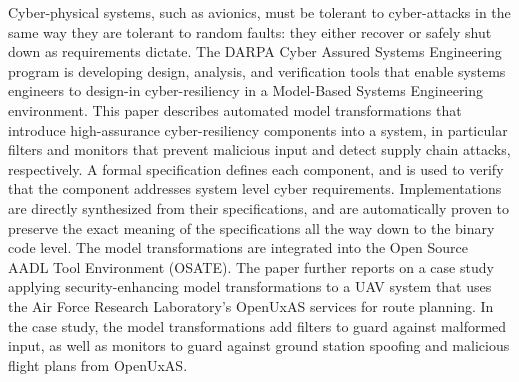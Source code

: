 Cyber-physical systems, such as avionics, must be tolerant to cyber-attacks in the same way they are tolerant to random faults: they either recover or safely shut down as requirements dictate. The DARPA Cyber Assured Systems Engineering program is developing design, analysis, and verification tools that enable systems engineers to design-in cyber-resiliency in a Model-Based Systems Engineering environment. This paper describes automated model transformations that introduce  high-assurance cyber-resiliency components into a system, in particular filters and monitors that prevent malicious input and detect supply chain attacks, respectively. A formal specification defines each component, and is used to verify that the component addresses system level cyber requirements. Implementations are directly synthesized from their specifications, and are automatically proven to preserve the exact meaning of the specifications all the way down to the binary code level. The model transformations are integrated into the Open Source AADL Tool Environment (OSATE). The paper further reports on a case study applying security-enhancing model transformations to a UAV system that uses the Air Force Research Laboratory's OpenUxAS services for route planning. In the case study, the model transformations add filters to guard against malformed input, as well as monitors to guard against ground station spoofing and malicious flight plans from OpenUxAS.
